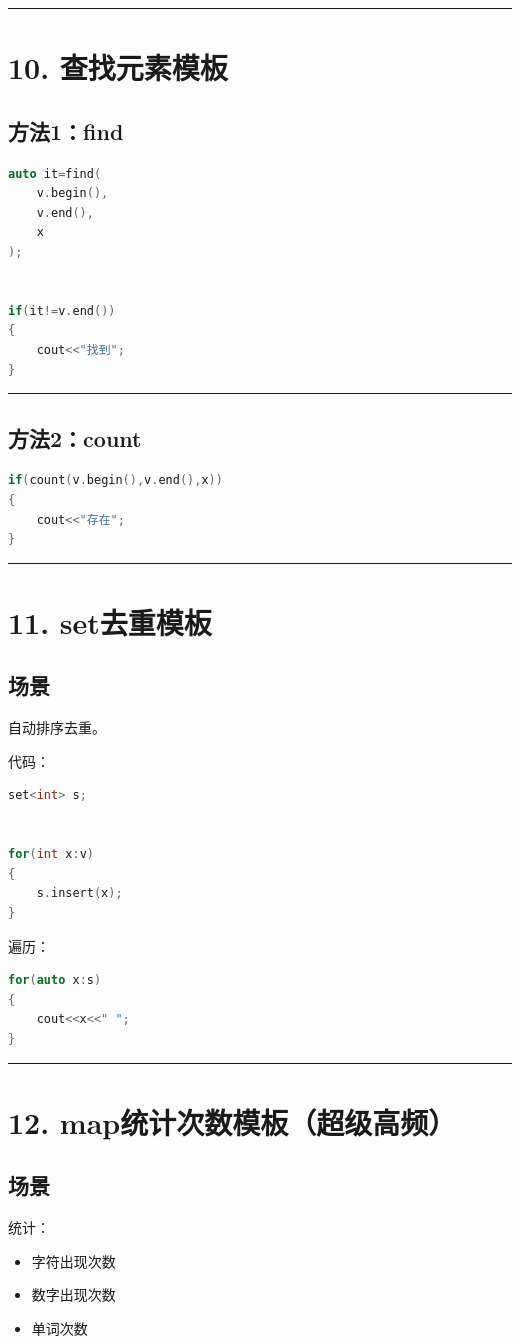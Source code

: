 \documentclass[9pt,twocolumn]{extarticle}
\begin{document}
\noindent\rule{\linewidth}{0.4pt}

\section{10. 查找元素模板}

\subsection{方法1：find}
\begin{lstlisting}[language=C++]
auto it=find(
    v.begin(),
    v.end(),
    x
);


if(it!=v.end())
{
    cout<<"找到";
}
\end{lstlisting}

\noindent\rule{\linewidth}{0.4pt}

\subsection{方法2：count}
\begin{lstlisting}[language=C++]
if(count(v.begin(),v.end(),x))
{
    cout<<"存在";
}
\end{lstlisting}

\noindent\rule{\linewidth}{0.4pt}

\section{11. set去重模板}

\subsection{场景}
自动排序去重。

代码：
\begin{lstlisting}[language=C++]
set<int> s;


for(int x:v)
{
    s.insert(x);
}
\end{lstlisting}
遍历：
\begin{lstlisting}[language=C++]
for(auto x:s)
{
    cout<<x<<" ";
}
\end{lstlisting}

\noindent\rule{\linewidth}{0.4pt}

\section{12. map统计次数模板（超级高频）}

\subsection{场景}
统计：
\begin{itemize}
    \item 字符出现次数
    \item 数字出现次数
    \item 单词次数
\end{itemize}
\end{document}
